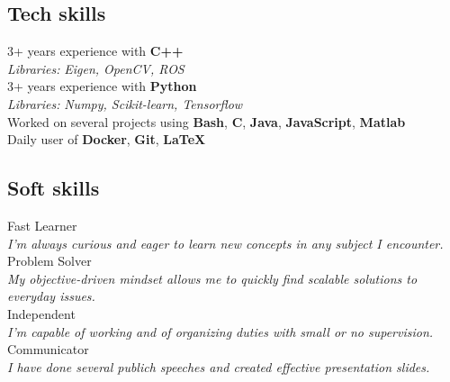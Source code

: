 \documentclass[letterpaper]{soragna-onepage-twocols} %
\begin{document}
\begin{minipage}[t]{0.3\textwidth}
\subsection{Tech skills}

3+ years experience with \textbf{C++}\\
{\emph{Libraries:} \small\emph{Eigen, OpenCV, ROS}}\\
3+ years experience with \textbf{Python}\\
{\emph{Libraries:} \small\emph{Numpy, Scikit-learn, Tensorflow}}\\
Worked on several projects using \textbf{Bash}, \textbf{C}, \textbf{Java}, \textbf{JavaScript},  \textbf{Matlab}\\
Daily user of \textbf{Docker}, \textbf{Git}, \textbf{LaTeX}\\

\subsection{Soft skills}

Fast Learner\\
\emph{I'm always curious and eager to learn new concepts in any subject I encounter.}\\
Problem Solver\\
\emph{My objective-driven mindset allows me to quickly find scalable solutions to everyday issues.}\\
Independent\\
\emph{I'm capable of working and of organizing duties with small or no supervision.}\\
Communicator\\
\emph{I have done several publich speeches and created effective presentation slides.}\\







\end{minipage} %
\hfill
%
\end{document}
